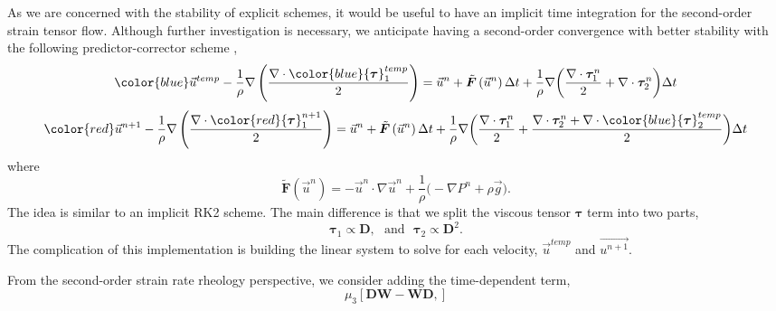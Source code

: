 \par
As we are concerned with the stability of explicit schemes, it would be useful to have an implicit time integration for the second-order strain tensor flow. Although further investigation is necessary, we anticipate having a second-order convergence with better stability with the following predictor-corrector scheme \cite{press_numerical_2007},
\[
{\color{blue}\vec{u}^{temp}} -
\frac{1}{\rho} \nabla
\left( 
\frac{\nabla \cdot {\color{blue}{\bm \tau}_1^{temp}}}{2}
\right)
=
\vec{u}^n
+ \tilde{\bm F} \left( \vec{u}^{n} \right) \Delta t
+ \frac{1}{\rho} \nabla \biggl(
\frac{ \nabla \cdot{\bm \tau}_1^n}{2} 
+ \nabla \cdot {\bm \tau}_2^n 
\biggr)\Delta t
\]
\[
{\color{red}\vec{u}^{n+1}} 
- \frac{1}{\rho}\nabla 
\left(
\frac{\nabla \cdot {\color{red}{\bm \tau}_1^{n+1}}}{2}
\right)
=
\vec{u}^n 
+ \tilde{\bm F} \left( \vec{u}^{n} \right) \Delta t
+ \frac{1}{\rho} \nabla \biggl(
\frac{ \nabla \cdot{\bm \tau}_1^n}{2} 
+ \frac{\nabla \cdot {\bm \tau}_2^{n} + \nabla \cdot {\color{blue}{\bm \tau}_2^{temp}}}{2} 
\biggr)\Delta t
\] 
where 
\[
  \tilde{\bm F} \left( \vec{u}^{n} \right)= 
    -\vec{u}^n \cdot \nabla \vec{u}^n 
    +\frac{1}{\rho}
    \biggl(
    - \nabla P^n 
        +  \rho  \vec{g} 
        \biggr).
\]
The idea is similar to an implicit RK2 scheme. The main difference is that we split the viscous tensor $\bm \tau$ term into two parts,
\[
{\bm \tau_1} \propto {\bm D}, \ \ \ {\text{and}} \ \ \  {\bm \tau_2} \propto {\bm D^2}.
\]
The complication of this implementation is building the linear system to solve for each velocity, $\vec{u}^{temp}$ and $\vec{u^{n+1}}$. 
\par
From the second-order strain rate rheology perspective, we consider adding the time-dependent term, 
\begin{equation}
  \mu_3  \left[ {\bm D}{\bm W} - {\bm W}{\bm D},\right]
  \end{equation}
